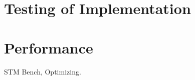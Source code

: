 \makeatletter {}\makeatother
{}
\section{Testing of Implementation}
\section{Performance}
STM Bench, Optimizing.
\worksheetend